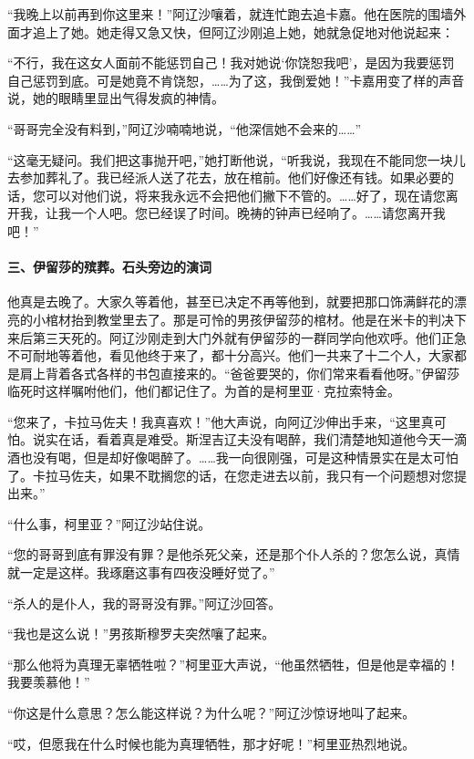 \par “我晚上以前再到你这里来！”阿辽沙嚷着，就连忙跑去追卡嘉。他在医院的围墙外面才追上了她。她走得又急又快，但阿辽沙刚追上她，她就急促地对他说起来：
\par “不行，我在这女人面前不能惩罚自己！我对她说‘你饶恕我吧’，是因为我要惩罚自己惩罚到底。可是她竟不肯饶恕，……为了这，我倒爱她！”卡嘉用变了样的声音说，她的眼睛里显出气得发疯的神情。
\par “哥哥完全没有料到，”阿辽沙喃喃地说，“他深信她不会来的……”
\par “这毫无疑问。我们把这事抛开吧，”她打断他说，“听我说，我现在不能同您一块儿去参加葬礼了。我已经派人送了花去，放在棺前。他们好像还有钱。如果必要的话，您可以对他们说，将来我永远不会把他们撇下不管的。……好了，现在请您离开我，让我一个人吧。您已经误了时间。晚祷的钟声已经响了。……请您离开我吧！”
\paragraph*{三、伊留莎的殡葬。石头旁边的演词}
\par 他真是去晚了。大家久等着他，甚至已决定不再等他到，就要把那口饰满鲜花的漂亮的小棺材抬到教堂里去了。那是可怜的男孩伊留莎的棺材。他是在米卡的判决下来后第三天死的。阿辽沙刚走到大门外就有伊留莎的一群同学向他欢呼。他们正急不可耐地等着他，看见他终于来了，都十分高兴。他们一共来了十二个人，大家都是肩上背着各式各样的书包直接来的。“爸爸要哭的，你们常来看看他呀。”伊留莎临死时这样嘱咐他们，他们都记住了。为首的是柯里亚·克拉索特金。
\par “您来了，卡拉马佐夫！我真喜欢！”他大声说，向阿辽沙伸出手来，“这里真可怕。说实在话，看着真是难受。斯涅吉辽夫没有喝醉，我们清楚地知道他今天一滴酒也没有喝，但是却好像喝醉了。……我一向很刚强，可是这种情景实在是太可怕了。卡拉马佐夫，如果不耽搁您的话，在您走进去以前，我只有一个问题想对您提出来。”
\par “什么事，柯里亚？”阿辽沙站住说。
\par “您的哥哥到底有罪没有罪？是他杀死父亲，还是那个仆人杀的？您怎么说，真情就一定是这样。我琢磨这事有四夜没睡好觉了。”
\par “杀人的是仆人，我的哥哥没有罪。”阿辽沙回答。
\par “我也是这么说！”男孩斯穆罗夫突然嚷了起来。
\par “那么他将为真理无辜牺牲啦？”柯里亚大声说，“他虽然牺牲，但是他是幸福的！我要羡慕他！”
\par “你这是什么意思？怎么能这样说？为什么呢？”阿辽沙惊讶地叫了起来。
\par “哎，但愿我在什么时候也能为真理牺牲，那才好呢！”柯里亚热烈地说。
